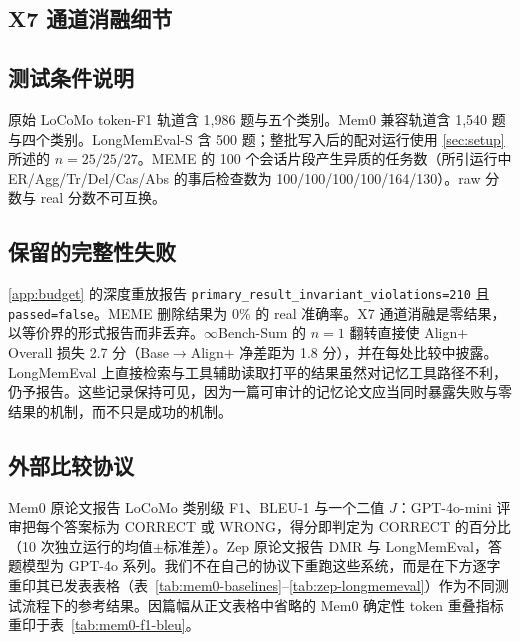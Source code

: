 \subsection{X7 通道消融细节}




\subsection{测试条件说明}

原始 LoCoMo token-F1 轨道含 1{,}986 题与五个类别。Mem0 兼容轨道含 1{,}540 题与四个类别。LongMemEval-S 含 500 题；整批写入后的配对运行使用 \cref{sec:setup} 所述的 $n{=}25/25/27$。MEME 的 100 个会话片段产生异质的任务数（所引运行中 ER/Agg/Tr/Del/Cas/Abs 的事后检查数为 100/100/100/100/164/130）。raw 分数与 real 分数不可互换。

\subsection{保留的完整性失败}

\cref{app:budget} 的深度重放报告 \texttt{primary\_result\_invariant\_violations=210} 且 \texttt{passed=false}。MEME 删除结果为 0\% 的 real 准确率。X7 通道消融是零结果，以等价界的形式报告而非丢弃。$\infty$Bench-Sum 的 $n{=}1$ 翻转直接使 Align+ Overall 损失 2.7 分（Base$\to$Align+ 净差距为 1.8 分），并在每处比较中披露。LongMemEval 上直接检索与工具辅助读取打平的结果虽然对记忆工具路径不利，仍予报告。这些记录保持可见，因为一篇可审计的记忆论文应当同时暴露失败与零结果的机制，而不只是成功的机制。

\subsection{外部比较协议}
\label{sec:published-baselines}

Mem0 原论文报告 LoCoMo 类别级 F1、BLEU-1 与一个二值 $J$：GPT-4o-mini 评审把每个答案标为 CORRECT 或 WRONG，得分即判定为 CORRECT 的百分比（10 次独立运行的均值$\pm$标准差）。Zep 原论文报告 DMR 与 LongMemEval，答题模型为 GPT-4o 系列。我们不在自己的协议下重跑这些系统，而是在下方逐字重印其已发表表格（表~\ref{tab:mem0-baselines}--\ref{tab:zep-longmemeval}）作为不同测试流程下的参考结果。因篇幅从正文表格中省略的 Mem0 确定性 token 重叠指标重印于表~\ref{tab:mem0-f1-bleu}。



